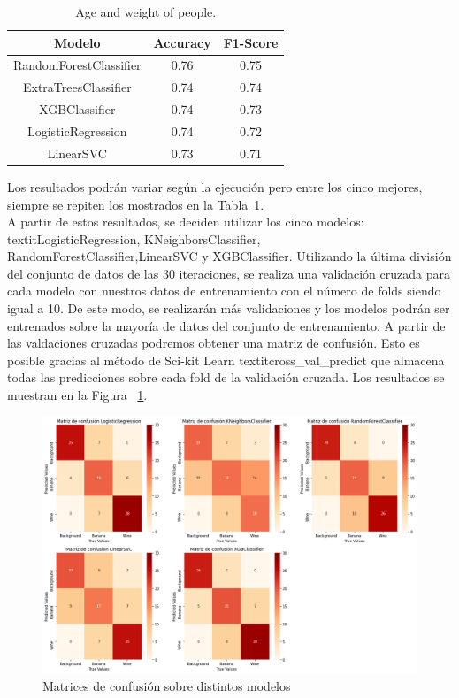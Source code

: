 \documentclass{esannV2}
\begin{document}
\begin{table}[t!]
  \centering
  \begin{tabular}{|c|c|c|}
    \hline
    Modelo & Accuracy & F1-Score \\
    \hline
    RandomForestClassifier & 0.76 & 0.75 \\ 
	ExtraTreesClassifier & 0.74 & 0.74 \\ 
	XGBClassifier & 0.74 & 0.73 \\ 
	LogisticRegression & 0.74 & 0.72 \\ 
	LinearSVC & 0.73 & 0.71 \\ 
    \hline
  \end{tabular}
  \caption{Age and weight of people.}\label{tab:lazypred}
\end{table}

Los resultados podrán variar según la ejecución pero entre los cinco mejores, siempre se repiten los mostrados en la Tabla~\ref{tab:lazypred}.\\

A partir de estos resultados, se deciden utilizar  los cinco modelos: textit{LogisticRegression, KNeighborsClassifier, RandomForestClassifier,LinearSVC y XGBClassifier}. Utilizando la última división del conjunto de datos de las 30 iteraciones, se realiza una validación cruzada para cada modelo con nuestros datos de entrenamiento con el número de folds siendo igual a 10. De este modo, se realizarán más validaciones y los modelos podrán ser entrenados sobre la mayoría de datos del conjunto de entrenamiento. A partir de las valdaciones cruzadas podremos obtener una matriz de confusión. Esto es posible gracias al método de Sci-kit Learn  textit{cross\_val\_predict} que almacena todas las predicciones sobre cada fold de la validación cruzada.  Los resultados se muestran en la Figura ~\ref{fig:cm}.  \\

\begin{figure}[b!]
\centering
\includegraphics[scale=0.3]{img/matrices_confusion.png}
\caption{Matrices de confusión sobre distintos modelos}\label{fig:cm}
\end{figure}
\end{document}
